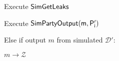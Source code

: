 \begin{bbox}[title={$\mathcal{S}_{pay}(P_s, P_r, b_r, b_s)$}]
\begin{renumerate}
			\quad Execute ${\mathsf {SimGetLeaks}}$

			\quad Execute ${\mathsf {SimPartyOutput(m, P_i')}}$

		\item Else if output $m$ from simulated $\mathcal{D}'$:
			
			\quad \Send $m \rightarrow \mathcal{Z}$

	\end{renumerate}

\end{bbox}
